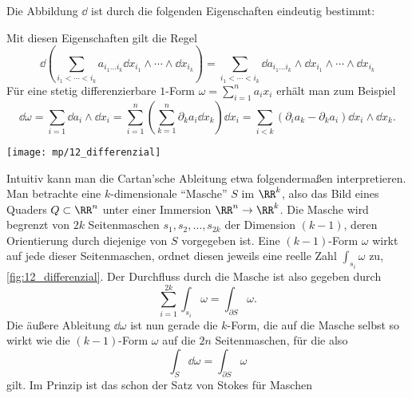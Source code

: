 \begin{antwort}
  Die Abbildung $\dd$ ist durch die folgenden 
  Eigenschaften eindeutig bestimmt:

  Mit diesen Eigenschaften gilt die Regel
  \[
  \boxed{
    \dd \left( \sum_{i_1 <\cdots< i_k} a_{i_1\ldots i_k} \dd x_{i_1} \wedge 
      \cdots \wedge \dd x_{i_k} \right) = 
    \sum_{i_1 <\cdots< i_k} \dd a_{i_1\ldots i_k} \wedge 
    \dd x_{i_1} \wedge 
    \cdots \wedge \dd x_{i_k}  }
  \]
  Für eine stetig differenzierbare $1$-Form 
  $\omega = \sum_{i=1}^n a_i x_i $ erhält man zum Beispiel 
  \[
  \dd \omega = 
  \sum_{i=1} \dd a_i \wedge \dd x_i = 
  \sum_{i=1}^n \left( \sum_{k=1}^n \partial_k a_i \dd x_k \right) \dd x_i 
  = 
  \sum_{i<k} (\partial_i a_k - \partial_k a_i ) \dd x_i \wedge \dd x_k.
  \] 

  \begin{center}
    \texttt{[image: mp/12\_differenzial]}
    \label{fig:12_differenzial}
  \end{center}
  
  Intuitiv kann man die Cartan'sche Ableitung etwa folgendermaßen 
  interpretieren. Man betrachte eine $k$-dimensionale 
  "`Masche"' $S$ im $\RR^k$, also das Bild eines Quaders 
  $Q\subset \RR^n$ unter einer Immersion $\RR^n \to \RR^k$. 
  Die Masche wird begrenzt von 
  $2k$ Seitenmaschen $s_1,s_2,\ldots, s_{2k}$ 
  der Dimension $(k-1)$, deren 
  Orientierung durch diejenige von $S$ vorgegeben ist. 
  Eine $(k-1)$-Form $\omega$  
  wirkt auf jede dieser Seitenmaschen, ordnet diesen 
  jeweils eine reelle Zahl $\int_{s_i} \omega$ zu, 
  \sieheAbbildung\ref{fig:12_differenzial}. Der Durchfluss 
  durch die Masche ist also gegeben durch
  \[
  \sum_{i=1}^{2k} \int_{s_i} \omega = 
  \int_{\partial S} \omega.
  \]
  Die äußere Ableitung $\dd \omega$ ist nun gerade die $k$-Form, die auf 
  die Masche selbst so wirkt wie die $(k-1)$-Form $\omega$ auf die $2n$ 
  Seitenmaschen, für die also 
  \[
  \int_S \dd \omega = \int_{\partial S} \omega
  \]
  gilt. Im Prinzip ist das schon der Satz von Stokes  
  für Maschen \AntEnd
\end{antwort}

